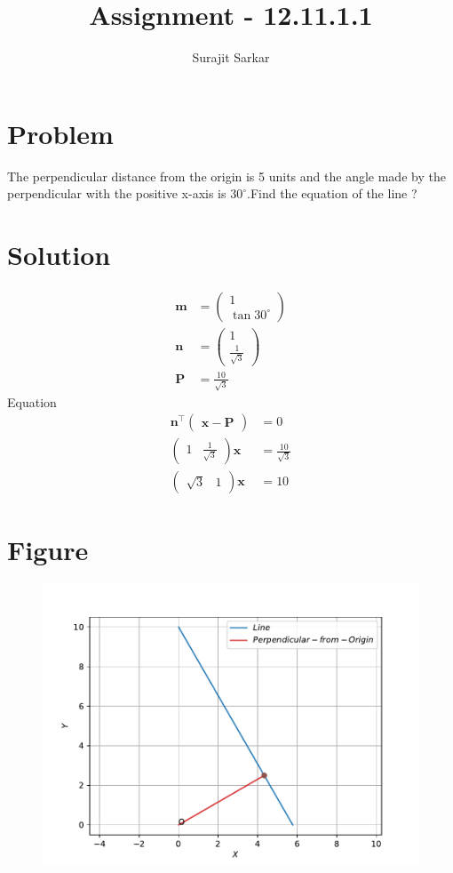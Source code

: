 \documentclass[journal,12pt,twocolumn]{IEEEtran}
\title{\mytitle}
\title{
Assignment - 12.11.1.1
}
\author{Surajit Sarkar}
\newcommand{\myvec}[1]{\ensuremath{\begin{pmatrix}#1\end{pmatrix}}}
\let\vec\mathbf
\begin{document}
\maketitle
\tableofcontents
\bigskip
\section{\textbf{Problem}}
The perpendicular distance from the origin is 5 units and the angle made by the perpendicular with the positive x-axis is $30^{\circ}$.Find the equation of the line ?
\section{\textbf{Solution}}
\begin{align}
\vec{m}&=\myvec{1\\\tan30^{\circ}}\\
\vec{n}&=\myvec{1\\\frac{1}{\sqrt{3}}}\\
\vec{P}&=\frac{10}{\sqrt{3}}
\end{align}
Equation
\begin{align}
    \vec{n}^{\top}\myvec{\vec{x}-\vec{P}}&=0\\
    \myvec{1&\frac{1}{\sqrt{3}}}\vec{x}&=\frac{10}{\sqrt{3}}\\
    \myvec{\sqrt{3}&1}\vec{x}&=10
\end{align}
\section{\textbf{Figure}}
\begin{figure}[!h]
\centering
\includegraphics[width=\columnwidth]{fig.pdf}
\caption{}
\label{fig:vec}
\end{figure}
\end{document}
